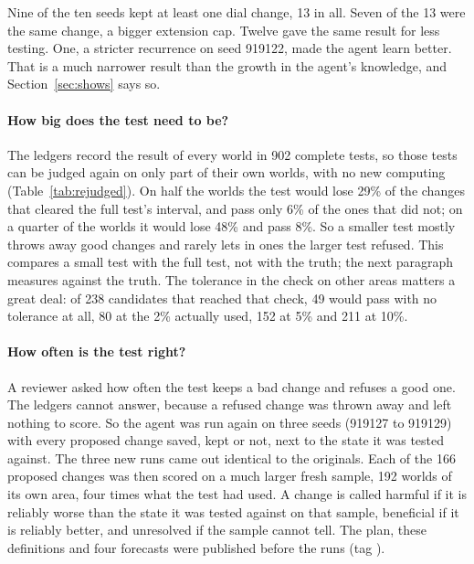 \documentclass[11pt]{article}
\begin{document}
Nine of the ten seeds kept at least one dial change, 13 in all. Seven of the 13 were the same change, a bigger extension cap. Twelve gave the same result for less testing. One, a stricter recurrence on seed 919122, made the agent learn better. That is a much narrower result than the growth in the agent's knowledge, and Section~\ref{sec:shows} says so.





\paragraph{How big does the test need to be?} The ledgers record the result of every world in 902 complete tests, so those tests can be judged again on only part of their own worlds, with no new computing (Table~\ref{tab:rejudged}). On half the worlds the test would lose 29\% of the changes that cleared the full test's interval, and pass only 6\% of the ones that did not; on a quarter of the worlds it would lose 48\% and pass 8\%. So a smaller test mostly throws away good changes and rarely lets in ones the larger test refused. This compares a small test with the full test, not with the truth; the next paragraph measures against the truth. The tolerance in the check on other areas matters a great deal: of 238 candidates that reached that check, 49 would pass with no tolerance at all, 80 at the 2\% actually used, 152 at 5\% and 211 at 10\%.



\paragraph{How often is the test right?} A reviewer asked how often the test keeps a bad change and refuses a good one. The ledgers cannot answer, because a refused change was thrown away and left nothing to score. So the agent was run again on three seeds (919127 to 919129) with every proposed change saved, kept or not, next to the state it was tested against. The three new runs came out identical to the originals. Each of the 166 proposed changes was then scored on a much larger fresh sample, 192 worlds of its own area, four times what the test had used. A change is called harmful if it is reliably worse than the state it was tested against on that sample, beneficial if it is reliably better, and unresolved if the sample cannot tell. The plan, these definitions and four forecasts were published before the runs (tag ).
\end{document}
